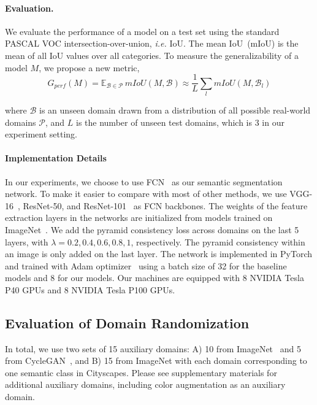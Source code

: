 \documentclass[10pt,twocolumn,letterpaper]{article}
\begin{document}
\paragraph{Evaluation.} We evaluate the performance of a model on a test set using the standard PASCAL VOC intersection-over-union, \textit{i.e.} IoU.
The mean IoU~(mIoU) is the mean of all IoU values over all categories. To measure the generalizability of a model $M$, we propose a new metric,
\vspace{-1mm}
$$G_{perf}(M)=\mathbb{E}_{\mathcal{B}\in\mathcal{P}}\,mIoU(M, \mathcal{B}) \approx \frac{1}{L} \sum_{l} mIoU(M,\mathcal{B}_l)$$ 

where $\mathcal{B}$ is an unseen domain drawn from a distribution of all possible real-world domains $\mathcal{P}$, and $L$ is the number of unseen test domains, which is 3 in our experiment setting.

\paragraph{Implementation Details}
In our experiments, we choose to use FCN~\cite{long2015fully} as our semantic segmentation network. To make it easier to compare with most of other methods, we use VGG-16~\cite{vgg}, ResNet-50, and ResNet-101~\cite{he2016deep} as FCN backbones. The weights of the feature extraction layers in the networks are initialized from models trained on ImageNet~\cite{deng2009imagenet}. We add the pyramid consistency loss across domains on the last 5 layers, with $\lambda=0.2, 0.4, 0.6, 0.8, 1$, respectively. The pyramid consistency within an image is only added on the last layer. The network is implemented in PyTorch and trained with Adam optimizer~\cite{adam} using a batch size of 32 for the baseline models and 8 for our  models. Our machines are equipped with 8 NVIDIA Tesla P40 GPUs and 8 NVIDIA Tesla P100 GPUs.


\subsection{Evaluation of Domain Randomization}
\label{subsec:eval_domain_randomization}
In total, we use two sets of 15 auxiliary domains: A) 10 from ImageNet~\cite{deng2009imagenet} and 5 from CycleGAN~\cite{CycleGAN2017}, and B) 15 from ImageNet with each domain corresponding to one semantic class in Cityscapes. Please see supplementary materials for additional auxiliary domains, including color augmentation as an auxiliary domain.
\end{document}
